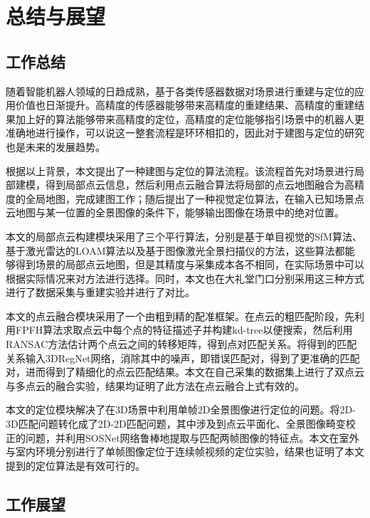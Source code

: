 
\chapter{总结与展望}
\label{ch5}
\section{工作总结}
随着智能机器人领域的日趋成熟，基于各类传感器数据对场景进行重建与定位的应用价值也日渐提升。高精度的传感器能够带来高精度的重建结果、高精度的重建结果加上好的算法能够带来高精度的定位，高精度的定位能够指引场景中的机器人更准确地进行操作，可以说这一整套流程是环环相扣的，因此对于建图与定位的研究也是未来的发展趋势。

根据以上背景，本文提出了一种建图与定位的算法流程。该流程首先对场景进行局部建模，得到局部点云信息，然后利用点云融合算法将局部的点云地图融合为高精度的全局地图，完成建图工作；随后提出了一种视觉定位算法，在输入已知场景点云地图与某一位置的全景图像的条件下，能够输出图像在场景中的绝对位置。

本文的局部点云构建模块采用了三个平行算法，分别是基于单目视觉的SfM算法、基于激光雷达的LOAM算法以及基于图像激光全景扫描仪的方法，这些算法都能够得到场景的局部点云地图，但是其精度与采集成本各不相同，在实际场景中可以根据实际情况来对方法进行选择。同时，本文也在大礼堂门口分别采用这三种方式进行了数据采集与重建实验并进行了对比。

本文的点云融合模块采用了一个由粗到精的配准框架。在点云的粗匹配阶段，先利用FPFH算法求取点云中每个点的特征描述子并构建kd-tree以便搜索，然后利用RANSAC方法估计两个点云之间的转移矩阵，得到点对匹配关系。将得到的匹配关系输入3DRegNet网络，消除其中的噪声，即错误匹配对，得到了更准确的匹配对，进而得到了精细化的点云匹配结果。本文在自己采集的数据集上进行了双点云与多点云的融合实验，结果均证明了此方法在点云融合上式有效的。

本文的定位模块解决了在3D场景中利用单帧2D全景图像进行定位的问题。将2D-3D匹配问题转化成了2D-2D匹配问题，其中涉及到点云平面化、全景图像畸变校正的问题，并利用SOSNet网络鲁棒地提取与匹配两帧图像的特征点。本文在室外与室内环境分别进行了单帧图像定位于连续帧视频的定位实验，结果也证明了本文提到的定位算法是有效可行的。

\section{工作展望}

